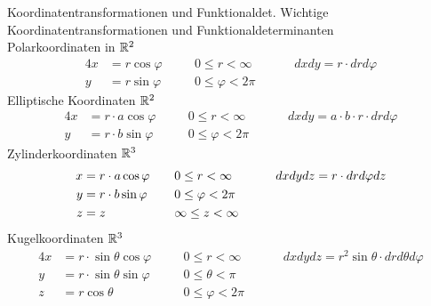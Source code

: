 \begin{Rechenregeln}{Koordinatentransformationen und Funktionaldet.}{}
	Wichtige Koordinatentransformationen und Funktionaldeterminanten\\
	
	Polarkoordinaten in $\mathbb{R}^2$
	\begin{alignat*}{4}
            x &= r \cos \varphi \quad &&0 \leq r < \infty \quad &&&dxdy = r \cdot drd\varphi\\
            y &= r \sin \varphi \quad &&0 \leq \varphi < 2\pi &&&
    \end{alignat*}
   	Elliptische Koordinaten $\mathbb{R}^2$
   	\begin{alignat*}{4}
            x &= r \cdot  a \cos \varphi\quad &&0 \leq r < \infty\quad &&&dxdy = a \cdot b \cdot  r \cdot drd\varphi\\
            y &= r \cdot b \sin \varphi\quad &&0 \leq \varphi < 2\pi &&&
   	\end{alignat*}
        Zylinderkoordinaten $\mathbb{R}^3$ \begin{alignat*}{4}
            x &= r \cdot  a \cos \varphi\quad &&0 \leq r < \infty &&&dxdydz = r \cdot drd\varphi dz\\
            y &= r \cdot b \sin \varphi\quad &&0 \leq \varphi < 2\pi\\
            z &= z\quad &&\-\infty \leq z < \infty\quad
    	\end{alignat*}
        Kugelkoordinaten $\mathbb{R}^3$ \begin{alignat*}{4}
            x &= r \cdot \sin \theta \cos \varphi \quad &&0 \leq r < \infty \quad &&&dxdydz = r^2 \sin \theta \cdot drd\theta d\varphi\\
            y &= r \cdot \sin \theta \sin \varphi \quad && 0 \leq \theta < \pi &&&\\
            z &= r \cos \theta \quad &&0 \leq \varphi < 2\pi &&&
        \end{alignat*}
\end{Rechenregeln}

